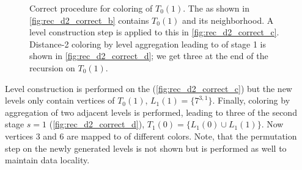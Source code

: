 \begin{figure}[tbp]
     	\centering
     	\hspace{0.6em}
     	\hspace{0.6em}
     	\hspace{0.6em}
     	\hspace{0.6em}
     	\caption{Correct procedure for \DTWO coloring of \levelGroup $T_0(1)$. The \subgraph as shown in \cref{fig:rec_d2_correct_b} contains \levelGroup $T_0(1)$ and its \DONE neighborhood. A level construction step is applied to this \subgraph in \cref{fig:rec_d2_correct_c}. Distance-2 coloring by level aggregation leading to \levelGroups of stage 1 is shown in \cref{fig:rec_d2_correct_d}; we get three \levelGroups at the end of the recursion on $T_0(1)$.}
     	\label{fig:rec_d2_correct}
     \end{figure}
Level construction is performed on the \subgraph (\cref{fig:rec_d2_correct_c}) but the new levels only contain vertices of  $T_0(1)$, \ie $L_1(1) = \{7^{3,1}\}$. Finally, \DTWO coloring by aggregation of two adjacent levels is performed, leading to three \levelGroups of the second stage $s=1$ (\cref{fig:rec_d2_correct_d}), \ie $T_1(0)=\{L_1(0) \cup L_1(1)\}$.  Now vertices $3$ and $6$ are mapped to \levelGroups of different colors. Note, that the permutation step on the newly generated levels is not shown but is performed as well to maintain data locality. 
    
